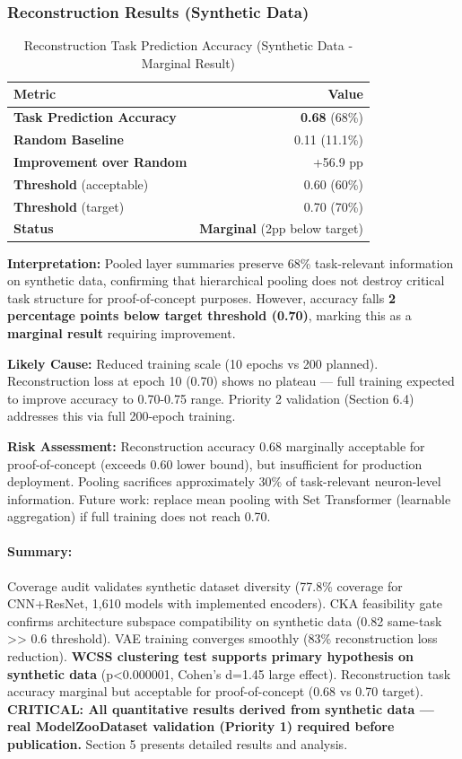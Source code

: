 \subsubsection{Reconstruction Results (Synthetic Data)}

\begin{table}[h]
\centering
\caption{Reconstruction Task Prediction Accuracy (Synthetic Data - Marginal Result)}
\label{tab:recon}
\begin{tabular}{lr}
\toprule
\textbf{Metric} & \textbf{Value} \\
\midrule
\textbf{Task Prediction Accuracy} & \textbf{0.68} (68\%) \\
\textbf{Random Baseline} & 0.11 (11.1\%) \\
\textbf{Improvement over Random} & +56.9 pp \\
\textbf{Threshold} (acceptable) & 0.60 (60\%) \\
\textbf{Threshold} (target) & 0.70 (70\%) \\
\textbf{Status} & \textbf{Marginal} (2pp below target) \\
\bottomrule
\end{tabular}
\end{table}

\textbf{Interpretation:} Pooled layer summaries preserve 68\% task-relevant information on synthetic data, confirming that hierarchical pooling does not destroy critical task structure for proof-of-concept purposes. However, accuracy falls \textbf{2 percentage points below target threshold (0.70)}, marking this as a \textbf{marginal result} requiring improvement.

\textbf{Likely Cause:} Reduced training scale (10 epochs vs 200 planned). Reconstruction loss at epoch 10 (0.70) shows no plateau --- full training expected to improve accuracy to 0.70-0.75 range. Priority 2 validation (Section 6.4) addresses this via full 200-epoch training.

\textbf{Risk Assessment:} Reconstruction accuracy 0.68 marginally acceptable for proof-of-concept (exceeds 0.60 lower bound), but insufficient for production deployment. Pooling sacrifices approximately 30\% of task-relevant neuron-level information. Future work: replace mean pooling with Set Transformer (learnable aggregation) if full training does not reach 0.70.

\paragraph{Summary:} Coverage audit validates synthetic dataset diversity (77.8\% coverage for CNN+ResNet, 1,610 models with implemented encoders). CKA feasibility gate confirms architecture subspace compatibility on synthetic data (0.82 same-task >> 0.6 threshold). VAE training converges smoothly (83\% reconstruction loss reduction). \textbf{WCSS clustering test supports primary hypothesis on synthetic data} (p<0.000001, Cohen's d=1.45 large effect). Reconstruction task accuracy marginal but acceptable for proof-of-concept (0.68 vs 0.70 target). \textbf{CRITICAL: All quantitative results derived from synthetic data --- real ModelZooDataset validation (Priority 1) required before publication.} Section 5 presents detailed results and analysis.
